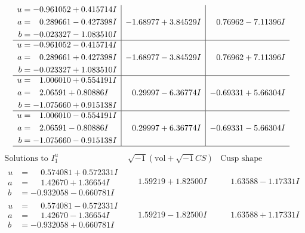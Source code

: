 \documentclass[1p]{elsarticle_modified}
\theoremstyle{definition}
\newcommand{\I}{\sqrt{-1}}
\begin{document}
$$\begin{array}{c|c|c}
\begin{aligned}
u &= -0.961052 + 0.415714 I \\
a &= \phantom{-}0.289661 - 0.427398 I \\
b &= -0.023327 - 1.083510 I\end{aligned}
 & -1.68977 + 3.84529 I & \phantom{-}0.76962 - 7.11396 I \\ \hline\begin{aligned}
u &= -0.961052 - 0.415714 I \\
a &= \phantom{-}0.289661 + 0.427398 I \\
b &= -0.023327 + 1.083510 I\end{aligned}
 & -1.68977 - 3.84529 I & \phantom{-}0.76962 + 7.11396 I \\ \hline\begin{aligned}
u &= \phantom{-}1.006010 + 0.554191 I \\
a &= \phantom{-}2.06591 + 0.80886 I \\
b &= -1.075660 + 0.915138 I\end{aligned}
 & \phantom{-}0.29997 - 6.36774 I & -0.69331 + 5.66304 I \\ \hline\begin{aligned}
u &= \phantom{-}1.006010 - 0.554191 I \\
a &= \phantom{-}2.06591 - 0.80886 I \\
b &= -1.075660 - 0.915138 I\end{aligned}
 & \phantom{-}0.29997 + 6.36774 I & -0.69331 - 5.66304 I\\
 \hline 
 \end{array}$$\newpage$$\begin{array}{c|c|c}  
\text{Solutions to }I^u_{1}& \I (\text{vol} + \sqrt{-1}CS) & \text{Cusp shape}\\
 \hline 
\begin{aligned}
u &= \phantom{-}0.574081 + 0.572331 I \\
a &= \phantom{-}1.42670 + 1.36654 I \\
b &= -0.932058 - 0.660781 I\end{aligned}
 & \phantom{-}1.59219 + 1.82500 I & \phantom{-}1.63588 - 1.17331 I \\ \hline\begin{aligned}
u &= \phantom{-}0.574081 - 0.572331 I \\
a &= \phantom{-}1.42670 - 1.36654 I \\
b &= -0.932058 + 0.660781 I\end{aligned}
 & \phantom{-}1.59219 - 1.82500 I & \phantom{-}1.63588 + 1.17331 I \\ \hline\begin{aligned}

\end{aligned}
\end{array}$$
\end{document}
